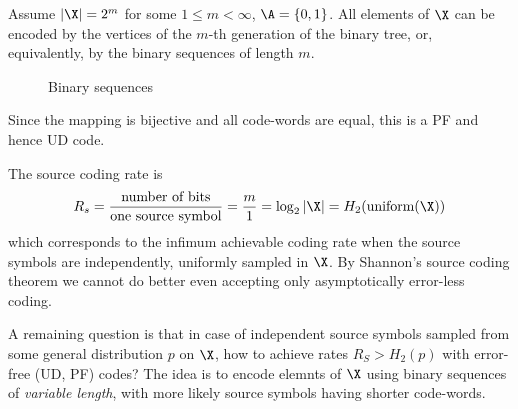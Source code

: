 \documentclass[toc]{../cs-classes/cs-classes}
\begin{document}
\begin{example}
    Assume $|\X|=2^m$ for some $1\leq m<\infty$, $\A=\{0, 1\}$. All elements of $\X$ can be encoded by the vertices of the $m$-th generation of the binary tree, or, equivalently, by the binary sequences of length $m$.

    \begin{figure}[!ht]
        \center
        \caption{Binary sequences}
    \end{figure}

    Since the mapping is bijective and all code-words are equal, this is a PF and hence UD code.

    The source coding rate is
    \begin{equation*}
        R_s=\frac{\textnormal{number of bits}}{\textnormal{one source symbol}} = \frac{m}{1} = \log_2|\X| = H_2(\textnormal{uniform}(\X))
    \end{equation*}
    which corresponds to the infimum achievable coding rate when the source symbols are independently, uniformly sampled in $\X$. By Shannon's source coding theorem we cannot do better even accepting only asymptotically error-less coding.
\end{example}

A remaining question is that in case of independent source symbols sampled from some general distribution $p$ on $\X$, how to achieve rates $R_S>H_2(p)$ with error-free (UD, PF) codes? The idea is to encode elemnts of $\X$ using binary sequences of \emph{variable length}, with more likely source symbols having shorter code-words.
\end{document}
